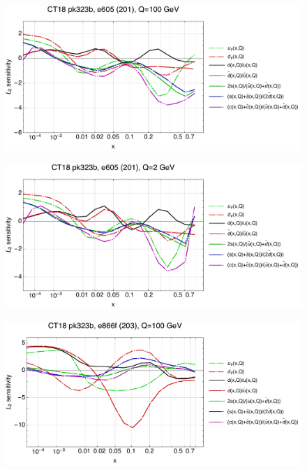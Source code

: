 \documentclass[10pt,aps,prd,floatfix,titlepage]{revtex4}
\begin{document}
\clearpage
\begin{figure}
\includegraphics[width=\textwidth,height=0.44\textheight,keepaspectratio]{2/201_ct18nn_q100_Sf_2.pdf}
\caption{}
\end{figure}
\begin{figure}
\includegraphics[width=\textwidth,height=0.44\textheight,keepaspectratio]{2/201_ct18nn_q2_Sf_2.pdf}
\caption{}
\end{figure}
\clearpage
\begin{figure}
\includegraphics[width=\textwidth,height=0.44\textheight,keepaspectratio]{2/203_ct18nn_q100_Sf_2.pdf}
\caption{}
\end{figure}
\end{document}
